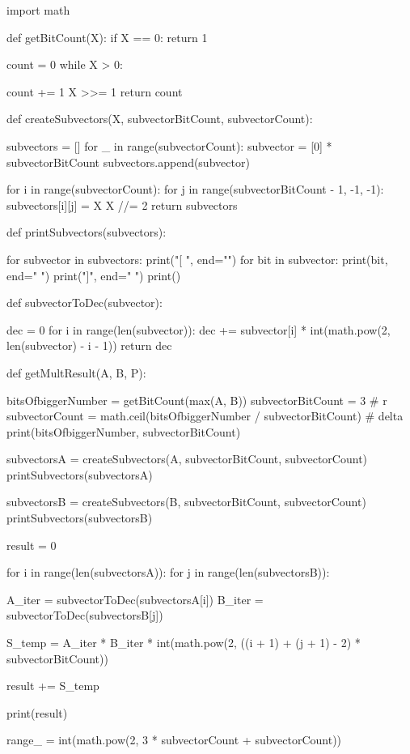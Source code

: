 \documentclass[11pt]{article}
\renewcommand\*{\cdot}
\begin{document}
\begin{python}

    import math


    def getBitCount(X):
    if X == 0:
    return 1

    count = 0
    while X > 0:

    count += 1
    X >>= 1
    return count


    def createSubvectors(X, subvectorBitCount, subvectorCount):

    subvectors = []
    for _ in range(subvectorCount):
    subvector = [0] * subvectorBitCount
    subvectors.append(subvector)

    for i in range(subvectorCount):
    for j in range(subvectorBitCount - 1, -1, -1):
    subvectors[i][j] = X %
    X //= 2
    return subvectors


    def printSubvectors(subvectors):

    for subvector in subvectors:
    print("[ ", end="")
    for bit in subvector:
    print(bit, end=" ")
    print("]", end=" ")
    print()


    def subvectorToDec(subvector):

    dec = 0
    for i in range(len(subvector)):
    dec += subvector[i] * int(math.pow(2, len(subvector) - i - 1))
    return dec


    def getMultResult(A, B, P):

    bitsOfbiggerNumber = getBitCount(max(A, B))
    subvectorBitCount = 3  # r
    subvectorCount = math.ceil(bitsOfbiggerNumber / subvectorBitCount)  # delta
    print(bitsOfbiggerNumber, subvectorBitCount)

    subvectorsA = createSubvectors(A, subvectorBitCount, subvectorCount)
    printSubvectors(subvectorsA)

    subvectorsB = createSubvectors(B, subvectorBitCount, subvectorCount)
    printSubvectors(subvectorsB)

    result = 0

    for i in range(len(subvectorsA)):
    for j in range(len(subvectorsB)):

    A_iter = subvectorToDec(subvectorsA[i])
    B_iter = subvectorToDec(subvectorsB[j])

    S_temp = A_iter * B_iter * int(math.pow(2,
    ((i + 1) + (j + 1) - 2) * subvectorBitCount)) %

    result += S_temp

    print(result)

    range_ = int(math.pow(2, 3 * subvectorCount + subvectorCount))


\end{python}
\end{document}
